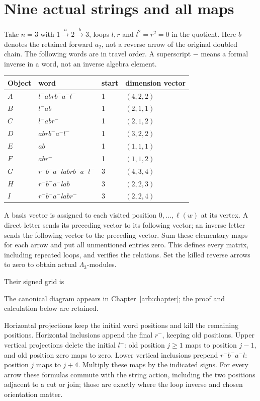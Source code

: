 \section{Nine actual strings and all maps}
Take $n=3$ with $1\xrightarrow{a}2\xrightarrow{b}3$, loops $l,r$ and $l^2=r^2=0$ in the quotient. Here $b$ denotes the retained forward $a_2$, not a reverse arrow of the original doubled chain. The following words are in travel order. A superscript $-$ means a formal inverse in a word, not an inverse algebra element.
\begin{center}\small
\begin{tabular}{llll}
\toprule
Object & word & start & dimension vector\\\midrule
$A$&$l^- a b r b^- a^- l^-$&1&$(4,2,2)$\\
$B$&$l^- a b$&1&$(2,1,1)$\\
$C$&$l^- a b r^-$&1&$(2,1,2)$\\
$D$&$a b r b^- a^- l^-$&1&$(3,2,2)$\\
$E$&$a b$&1&$(1,1,1)$\\
$F$&$a b r^-$&1&$(1,1,2)$\\
$G$&$r^- b^- a^- l a b r b^- a^- l^-$&3&$(4,3,4)$\\
$H$&$r^- b^- a^- l a b$&3&$(2,2,3)$\\
$I$&$r^- b^- a^- l a b r^-$&3&$(2,2,4)$\\\bottomrule
\end{tabular}
\end{center}
A basis vector is assigned to each visited position $0,\ldots,\ell(w)$ at its vertex. A direct letter sends its preceding vector to its following vector; an inverse letter sends the following vector to the preceding vector. Sum these elementary maps for each arrow and put all unmentioned entries zero. This defines every matrix, including repeated loops, and verifies the relations. Set the killed reverse arrows to zero to obtain actual $\Lambda_3$-modules.

Their signed grid is
\par\noindent The canonical diagram appears in Chapter~\ref{arb:chapter}; the proof and calculation below are retained.\par
Horizontal projections keep the initial word positions and kill the remaining positions. Horizontal inclusions append the final $r^-$, keeping old positions. Upper vertical projections delete the initial $l^-$: old position $j\ge1$ maps to position $j-1$, and old position zero maps to zero. Lower vertical inclusions prepend $r^-b^-a^-l$: position $j$ maps to $j+4$. Multiply these maps by the indicated signs. For every arrow these formulas commute with the string action, including the two positions adjacent to a cut or join; those are exactly where the loop inverse and chosen orientation matter.

